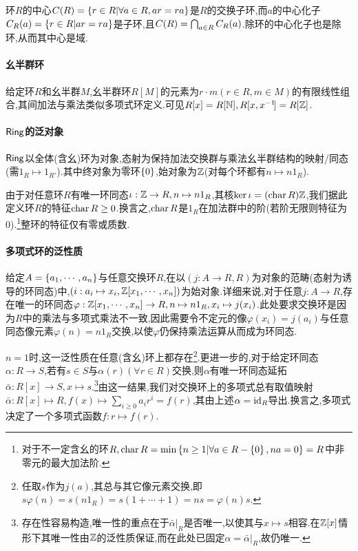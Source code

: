 \documentclass[11pt]{article} %
\begin{document}
环$R$的中心$C(R)=\left\{r\in R|\forall a\in R, ar=ra\right\}$是$R$的交换子环,而$a$的中心化子$C_R(a)=\left\{r\in R|ar=ra\right\}$是子环,且$C(R)=\bigcap_{a\in R}C_R(a)$.除环的中心化子也是除环,从而其中心是域.

\paragraph{幺半群环}
给定环$R$和幺半群$M$,幺半群环$R[M]$的元素为$r\cdot m(r\in R, m\in M)$的有限线性组合,其间加法与乘法类似多项式环定义.可见$R[x]=R[\mathbb{N}],R[x,x^{-1}\!]=R[\mathbb{Z}]$.

\paragraph{$\mathsf{Ring}$的泛对象}
$\mathsf{Ring}$以全体(含幺)环为对象,态射为保持加法交换群与乘法幺半群结构的映射/同态(需$1_R\mapsto 1_{R'}$).其中终对象为零环$\left\{0\right\}$,始对象为$\mathbb{Z}$(对每个环都有$n\mapsto n1_{R}$).

由于对任意环$R$有唯一环同态$\iota:\mathbb{Z}\to R, n\mapsto n1_R$,其核$\ker \iota=(\operatorname{char} R)\mathbb{Z}$,我们据此定义环$R$的特征$\operatorname{char} R\geq 0$.换言之,$\operatorname{char} R$是$1_R$在加法群中的阶(若阶无限则特征为0).\footnote{对于不一定含幺的环$R, \operatorname{char} R=\min\left\{n\geq 1|\forall a\in R-\left\{0\right\}, na=0\right\}=R$中非零元的最大加法阶.}整环的特征仅有零或质数.

\paragraph{多项式环的泛性质}
给定$A=\left\{a_1,\cdots,a_n\right\}$与任意交换环$R$,在以$(j:A\to R, R)$为对象的范畴(态射为诱导的环同态)中,$(i:a_i\mapsto x_i,\mathbb{Z}[x_1,\cdots,x_n])$为始对象.详细来说,对于任意$j:A\to R$,存在唯一的环同态$\varphi:\mathbb{Z}[x_1,\cdots,x_n]\to R, n\mapsto n1_{R}, x_i\mapsto j(x_i)$.此处要求交换环是因为$R$中的乘法与多项式乘法不一致,因此需要令不定元的像$\varphi(x_i)=j(a_i)$与任意同态像元素$\varphi(n)=n1_R$交换,以使$\varphi$仍保持乘法运算从而成为环同态.

$n=1$时,这一泛性质在任意(含幺)环上都存在\footnote{任取$s$作为$j(a)$,其总与其它像元素交换,即$s\varphi(n)=s(n1_R)=s(1+\cdots+1)=ns=\varphi(n)s$.}.更进一步的,对于给定环同态$\alpha:R\to S$,若有$s\in S$与$\alpha(r) (\forall r\in R)$交换,则$\alpha$有唯一环同态延拓$\bar{\alpha}:R[x]\to S, x\mapsto s$.\footnote{存在性容易构造,唯一性的重点在于$\bar{\alpha}|_R$是否唯一,以使其与$x\mapsto s$相容.在$\mathbb{Z}[x]$情形下其唯一性由$\mathbb{Z}$的泛性质保证,而在此处已固定$\alpha=\bar{\alpha}|_R$,故仍唯一.}由这一结果,我们对交换环上的多项式总有取值映射$\bar{\alpha}:R[x]\mapsto R, f(x)\mapsto \sum_{i\geq 0}a_ir^i=f(r)$,其由上述$\alpha=\mathrm{id}_R$导出.换言之,多项式决定了一个多项式函数$f:r\mapsto f(r)$.
\end{document}
